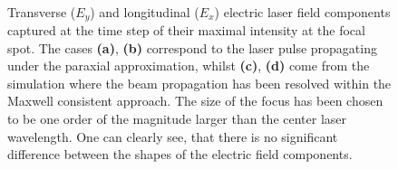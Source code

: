 \begin{figure}[h!]
	\centering
	\hspace{2mm}
	\\
	\hspace{2mm}
	\caption{Transverse ($ E_{y} $) and longitudinal ($ E_{x} $) electric laser field components captured at the time step of their maximal intensity at the focal spot. The cases \textbf{(a)}, \textbf{(b)} correspond to the laser pulse propagating under the paraxial approximation, whilst \textbf{(c)}, \textbf{(d)} come from the simulation where the beam propagation has been resolved within the Maxwell consistent approach. The size of the focus has been chosen to be one order of the magnitude larger than the center laser wavelength. One can clearly see, that there is no significant difference between the shapes of the electric field components.}
	\label{fig:5}
\end{figure}

